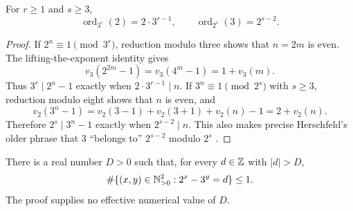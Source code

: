 \begin{lemma}
\label{lem:Herschfeld-orders}
For $r\geq1$ and $s\geq3$,
\begin{equation}
\label{eq:Herschfeld-orders}
 \operatorname{ord}_{3^r}(2)=2\cdot3^{r-1},
 \qquad
 \operatorname{ord}_{2^s}(3)=2^{s-2}.
\end{equation}
\end{lemma}

\begin{proof}
If $2^n\equiv1\pmod{3^r}$, reduction modulo three shows that $n=2m$ is
even.  The lifting-the-exponent identity gives
\[
 v_3(2^{2m}-1)=v_3(4^m-1)=1+v_3(m).
\]
Thus $3^r\mid2^n-1$ exactly when $2\cdot3^{r-1}\mid n$.  If
$3^n\equiv1\pmod{2^s}$ with $s\geq3$, reduction modulo eight shows that
$n$ is even, and
\[
 v_2(3^n-1)=v_2(3-1)+v_2(3+1)+v_2(n)-1=2+v_2(n).
\]
Therefore $2^s\mid3^n-1$ exactly when $2^{s-2}\mid n$.  This also makes
precise Herschfeld's older phrase that $3$ ``belongs to'' $2^{s-2}$ modulo
$2^s$ \cite[pp.~232--234]{Herschfeld1936}.
\end{proof}

\begin{theorem}
\label{thm:Herschfeld-positive-eventual-uniqueness}
There is a real number $D>0$ such that, for every $d\in\mathbb{Z}$ with $|d|>D$,
\begin{equation}
\label{eq:Herschfeld-positive-fibre}
 \#\{(x,y)\in\mathbb{N}_{>0}^2:2^x-3^y=d\}\leq1.
\end{equation}
The proof supplies no effective numerical value of $D$.
\end{theorem}

